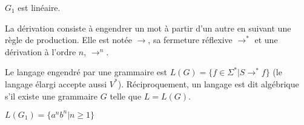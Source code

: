 \documentclass[a4paper]{article}
\begin{document}
\begin{ex}$G_1$ est linéaire.\end{ex}

La dérivation consiste à engendrer un mot à partir d'un autre en suivant une règle de production. Elle est notée $\rightarrow$, sa fermeture réflexive $\rightarrow^*$ et une dérivation à l'ordre $n$, $\rightarrow^n$.

\begin{defi}
Le langage engendré par une grammaire est $L(G) = \{f\in\Sigma^* | S\rightarrow^*f\}$ (le langage élargi accepte aussi $V^*$). Réciproquement, un langage est dit algébrique s'il existe une grammaire $G$ telle que $L=L(G)$.
\end{defi}

\begin{ex}$L(G_1)=\{a^nb^n | n\geqslant1\}$\end{ex}
\end{document}
